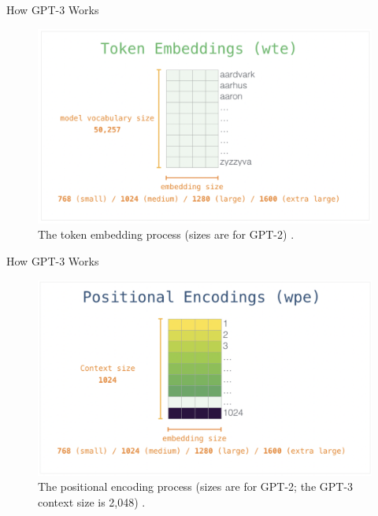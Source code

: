 \documentclass{beamer}
\begin{document}
\begin{frame}{How GPT-3 Works}
    \begin{figure}
        \centering
        \includegraphics[scale=0.45]{gpt3_token_embeddings}
        \caption{The token embedding process (sizes are for GPT-2) \cite{alammar2019}.}
        \label{fig:gpt3_token_embeddings}
    \end{figure}
\end{frame}

\begin{frame}{How GPT-3 Works}
    \begin{figure}
        \centering
        \includegraphics[scale=0.45]{gpt3_positional_encodings}
        \caption{The positional encoding process (sizes are for GPT-2; the GPT-3 context size is 2,048)  \cite{alammar2019}.}
        \label{fig:gpt3_positional_encodings}
    \end{figure}
\end{frame}
\end{document}
